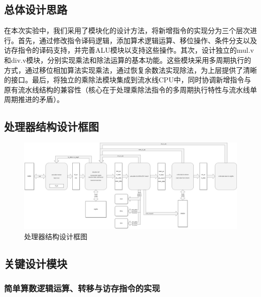 \documentclass[11pt]{article}
\begin{document}
\subsection{总体设计思路}

在本次实验中，我们采用了模块化的设计方法，将新增指令的实现分为三个层次进行。首先，通过修改指令译码逻辑，添加算术逻辑运算、移位操作、条件分支以及访存指令的译码支持，并完善ALU模块以支持这些操作。其次，设计独立的mul.v和div.v模块，分别实现乘法和除法运算的基本功能。这些模块采用多周期执行的方式，通过移位相加算法实现乘法，通过恢复余数法实现除法，为上层提供了清晰的接口。最后，将独立的乘除法模块集成到流水线CPU中，同时协调新增指令与原有流水线结构的兼容性（核心在于处理乘除法指令的多周期执行特性与流水线单周期推进的矛盾）。

\subsection{处理器结构设计框图}

\begin{figure}[H]
  \centering
  \includegraphics[width=\textwidth]{fig/CPU_arch_prj3.png}
  \caption{处理器结构设计框图}
  \label{fig:processor_structure}
\end{figure}

\subsection{关键设计模块}

\subsubsection{简单算数逻辑运算、转移与访存指令的实现}
\end{document}

